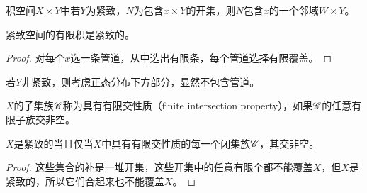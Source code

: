 \documentclass{ctexrep}
\begin{document}
  \begin{lemma}[管状引理]
    积空间$X\times Y$中若$Y$为紧致，$N$为包含$x\times Y$的开集，则$N$包含$x$的一个邻域$W\times Y$。
  \end{lemma}
  \begin{theorem}
    紧致空间的有限积是紧致的。
  \end{theorem}
  \begin{proof}
    对每个$x$选一条管道，从中选出有限条，每个管道选择有限覆盖。
  \end{proof}
  \begin{ex}
    若$Y$非紧致，则考虑正态分布下方部分，显然不包含管道。
  \end{ex}
  \begin{definition}
    $X$的子集族$\mathscr{C}$称为具有有限交性质（finite intersection property），如果$\mathscr{C}$的任意有限子族交非空。
  \end{definition}
  \begin{theorem}
    \label{thm:finiteinters}
    $X$是紧致的当且仅当$X$中具有有限交性质的每一个闭集族$\mathscr{C}$，其交非空。
  \end{theorem}
  \begin{proof}
    这些集合的补是一堆开集，这些开集中的任意有限个都不能覆盖$X$，但$X$是紧致的，所以它们合起来也不能覆盖$X$。
  \end{proof}
\end{document}
